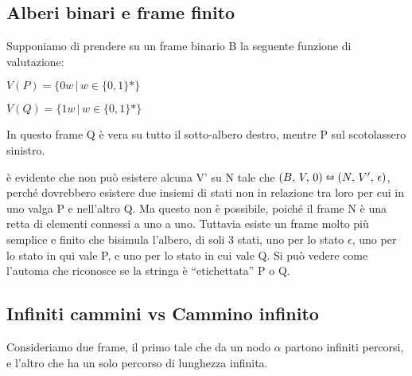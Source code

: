 \subsection{Alberi binari e frame finito}

Supponiamo di prendere su un frame binario B la seguente funzione
di valutazione:

$V(P)=\{0w\,|\, w\in\{0,1\}*\}$

$V(Q)=\{1w\,|\, w\in\{0,1\}*\}$

In questo frame Q è vera su tutto il sotto-albero destro, mentre P
sul scotolassero sinistro.

è evidente che non può esistere alcuna V' su N tale che $(B,\, V,\,0)\leftrightarroweq(N,\, V',\,\epsilon)$,
perché dovrebbero esistere due insiemi di stati non in relazione tra
loro per cui in uno valga P e nell'altro Q. Ma questo non è possibile,
poiché il frame N è una retta di elementi connessi a uno a uno. Tuttavia
esiste un frame molto più semplice e finito che bisimula l'albero,
di soli 3 stati, uno per lo stato $\epsilon$, uno per lo stato in
qui vale P, e uno per lo stato in cui vale Q. Si può vedere come l'automa
che riconosce se la stringa è ``etichettata'' P o Q.

\begin{center}  \end{center} 


\subsection{Infiniti cammini vs Cammino infinito}

Consideriamo due frame, il primo tale che da un nodo $\alpha$ partono
infiniti percorsi, e l'altro che ha un solo percorso di lunghezza
infinita. 

